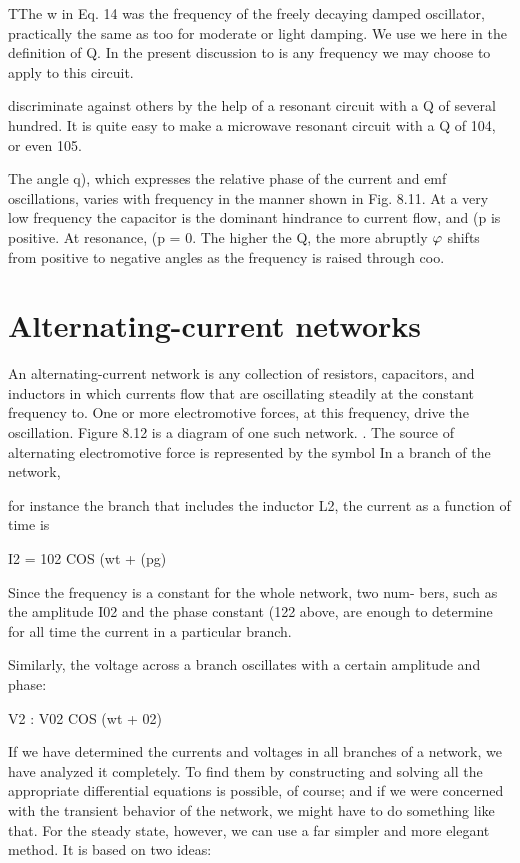 TThe w in Eq. 14 was the frequency of the freely decaying damped oscillator, practically
the same as too for moderate or light damping. We use we here in the definition
of Q. In the present discussion to is any frequency we may choose to apply to this circuit.

discriminate against others by the help of a resonant circuit with a Q
of several hundred. It is quite easy to make a microwave resonant
circuit with a Q of 104, or even 105.

The angle q), which expresses the relative phase of the current and
emf oscillations, varies with frequency in the manner shown in
Fig. 8.11. At a very low frequency the capacitor is the dominant
hindrance to current flow, and (p is positive. At resonance, (p = 0.
The higher the Q, the more abruptly $\varphi$ shifts from positive to negative
angles as the frequency is raised through coo.

\section{Alternating-current networks}

An alternating-current network is any collection of resistors,
capacitors, and inductors in which currents flow that are oscillating
steadily at the constant frequency to. One or more electromotive
forces, at this frequency, drive the oscillation. Figure 8.12 is a diagram
of one such network. . The source of alternating electromotive
force is represented by the symbol  In a branch of the network,

for instance the branch that includes the inductor L2, the current as
a function of time is

\begin{equation}
\end{equation}
I2 = 102 COS (wt + (pg) 

Since the frequency is a constant for the whole network, two num-
bers, such as the amplitude I02 and the phase constant (122 above, are
enough to determine for all time the current in a particular branch.

 

Similarly, the voltage across a branch oscillates with a certain
amplitude and phase:

\begin{equation}
\end{equation}
V2 : V02 COS (wt + 02) 

If we have determined the currents and voltages in all branches of
a network, we have analyzed it completely. To find them by constructing
and solving all the appropriate differential equations is
possible, of course; and if we were concerned with the transient behavior
of the network, we might have to do something like that. For
the steady state, however, we can use a far simpler and more elegant
method. It is based on two ideas:


